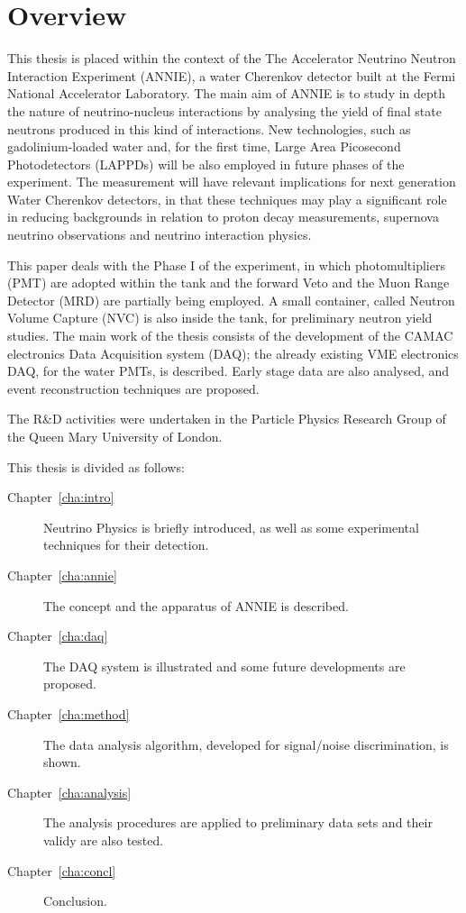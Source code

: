 \clearpage
\pagestyle{plain}
\chapter{Overview}
This thesis is placed within the context of the %
The Accelerator Neutrino Neutron Interaction Experiment (ANNIE), a water Cherenkov %
detector built at the Fermi National Accelerator Laboratory.
The main aim of ANNIE is to study in depth the nature of neutrino-nucleus interactions %
by analysing the yield of final state neutrons produced in this kind of interactions.
New technologies, such as gadolinium-loaded water and, for the first time, %
Large Area Picosecond Photodetectors (LAPPDs) will be also employed in future phases of %
the experiment.
The measurement will have relevant implications for next generation Water Cherenkov detectors, %
in that these techniques may play a significant role %
in reducing backgrounds in relation to proton decay measurements, %
supernova neutrino observations and neutrino interaction physics.

This paper deals with the Phase I of the experiment, in which photomultipliers (PMT) are adopted %
within the tank and the forward Veto and the Muon Range Detector (MRD) are %
partially being employed.
A small container, called Neutron Volume Capture (NVC) %
is also inside the tank, for preliminary neutron yield studies.
The main work of the thesis consists of the development of the CAMAC electronics %
Data Acquisition system (DAQ); the already existing VME electronics DAQ, %
for the water PMTs, is described.
Early stage data are also analysed, and event reconstruction %
techniques are proposed.

The R\&D activities were undertaken in the Particle Physics Research Group of the %
Queen Mary University of London.

\vspace{25mm}
This thesis is divided as follows:
\begin{description}
  \item[Chapter~\ref{cha:intro}] Neutrino Physics is briefly introduced, as well as some %
    experimental techniques for their detection.
  \item[Chapter~\ref{cha:annie}] The concept and the apparatus of ANNIE is described.
  \item[Chapter~\ref{cha:daq}] The DAQ system is illustrated and some future developments %
    are proposed.
  \item[Chapter~\ref{cha:method}] The data analysis algorithm, developed for signal/noise discrimination, is shown.
  \item[Chapter~\ref{cha:analysis}] The analysis procedures are applied to preliminary data sets and their validy %
    are also tested.
  \item[Chapter~\ref{cha:concl}] Conclusion.
\end{description}
